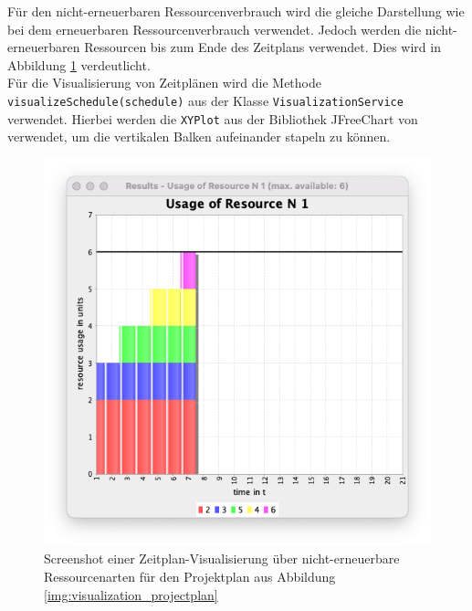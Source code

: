 Für den nicht-erneuerbaren Ressourcenverbrauch wird die gleiche Darstellung wie bei dem erneuerbaren Ressourcenverbrauch verwendet. Jedoch werden die nicht-erneuerbaren Ressourcen bis zum Ende des Zeitplans verwendet. Dies wird in Abbildung \ref{img:visualization_schedule_c} verdeutlicht. \\

Für die Visualisierung von Zeitplänen wird die Methode \lstinline|visualizeSchedule(schedule)| aus der Klasse \lstinline|VisualizationService| verwendet. Hierbei werden die \lstinline|XYPlot| aus der Bibliothek JFreeChart von \cite{gilbert_jfreechart_2021} verwendet, um die vertikalen Balken aufeinander stapeln zu können. 

\begin{figure}[H]
    \centering
    \includegraphics[width=0.47\linewidth]{assets/img/04_Umsetzung/ScreenshotN1.png}
    \caption{Screenshot einer Zeitplan-Visualisierung über nicht-erneuerbare Ressourcenarten für den Projektplan aus Abbildung \ref{img:visualization_projectplan}} 
    \label{img:visualization_schedule_c}
\end{figure}